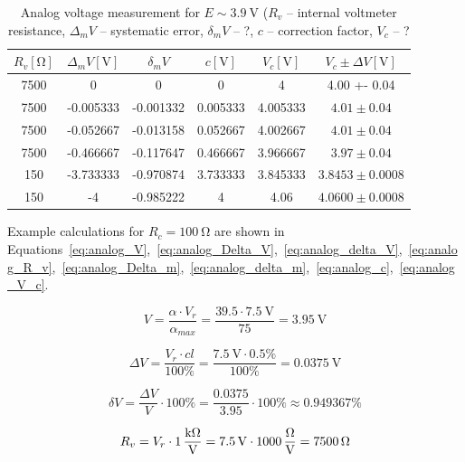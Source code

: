 \begin{table}[H]
	\centering
	\begin{tabular}{ c | c | c | c | c | c}
		$R_v [\unit{\ohm}]$  & $\Delta_m V [\unit{\volt}]$ & $\delta_m V $ & $c [\unit{\volt}]$ & $V_c [\unit{\volt}]$ & $V_c \pm \Delta V [\unit{\volt}]$\\
		\hline
		7500 & 0 & 0 & 0 & 4 & 4.00 +- 0.04\\
		\hline
		7500 & -0.005333 & -0.001332 & 0.005333 & 4.005333 & $4.01 \pm  0.04$\\
		\hline
		7500 & -0.052667 & -0.013158 & 0.052667 & 4.002667 & $4.01 \pm 0.04$\\
		\hline
		7500 & -0.466667 & -0.117647 & 0.466667 & 3.966667 & $3.97 \pm 0.04$\\
		\hline
		150 & -3.733333 & -0.970874 & 3.733333 & 3.845333 & $3.8453 \pm 0.0008$\\
		\hline
		150 & -4 & -0.985222 & 4 & 4.06 & $4.0600 \pm 0.0008$
	\end{tabular}
	\caption{Analog voltage measurement for $E \sim \SI{3.9}{\volt}$ ($R_v$ -- internal voltmeter resistance, $\Delta_m V$ -- systematic error, $\delta_m V$ -- ?, $c$ -- correction factor, $V_c$ -- ?}
	\label{tab:analog_volt_2}
\end{table}

Example calculations for $R_c = \SI{100}{\ohm} $ are shown in Equations~\ref{eq:analog_V},~\ref{eq:analog_Delta_V},~\ref{eq:analog_delta_V},~\ref{eq:analog_R_v},~\ref{eq:analog_Delta_m},~\ref{eq:analog_delta_m},~\ref{eq:analog_c},~\ref{eq:analog_V_c}.

\begin{equation}
	 V = \frac{\alpha\cdot V_{r}}{\alpha_{max}} = \frac{39.5\cdot \SI{7.5}{\volt}}{75} = \SI{3.95}{\volt}
	 \label{eq:analog_V}
\end{equation}

\begin{equation}
	\Delta V = \frac{V_{r}\cdot cl}{100\unit{\percent}} = \frac{\SI{7.5}{\volt}\cdot 0.5\unit{\percent}}{100 \unit{\percent}} = \SI{0.0375}{\volt}
	\label{eq:analog_Delta_V}
\end{equation}

\begin{equation}
	  \delta V = \frac{\Delta V}{V}\cdot 100\unit{\percent} = \frac{0.0375}{3.95}\cdot 100\unit{\percent} \approx 0.949367\unit{\percent}
	  \label{eq:analog_delta_V}
\end{equation}

\begin{equation}
	R_v = V_r\cdot \SI{1}{\frac{\kilo\ohm}{\volt}} = \SI{7.5}{\volt}\cdot \SI{1000}{\frac{\ohm}{\volt}} = \SI{7500}{\ohm}
	\label{eq:analog_R_v}
\end{equation}

